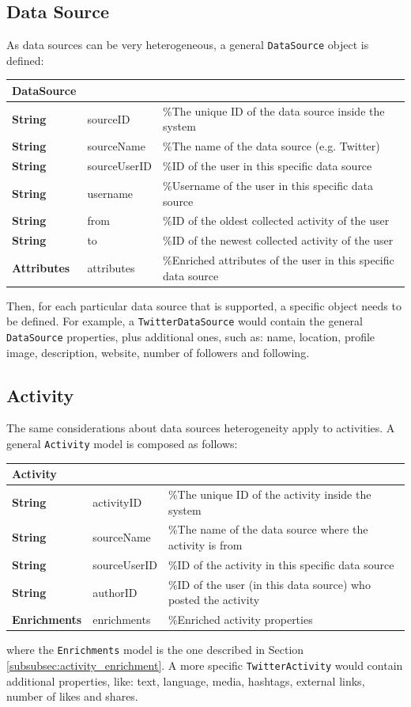 \subsection{Data Source}
As data sources can be very heterogeneous, a general \texttt{DataSource} object is defined:
\begin{center}
\begin{tabular}{lll}
\hline
DataSource & & \\
\hline
\textbf{String} & sourceID & \%The unique ID of the data source inside the system \\
\textbf{String} & sourceName & \%The name of the data source (e.g. Twitter) \\
\textbf{String} & sourceUserID & \%ID of the user in this specific data source \\
\textbf{String} & username & \%Username of the user in  this specific data source \\
\textbf{String} & from & \%ID of the oldest collected activity of the user \\
\textbf{String} & to & \%ID of the newest collected activity of the user \\
\textbf{Attributes} & attributes & \%Enriched attributes of the user in this specific data source \\
\hline
\end{tabular}
\end{center}
Then, for each particular data source that is supported, a specific object needs to be defined. For example, a \texttt{TwitterDataSource} would contain the general \texttt{DataSource} properties, plus additional ones, such as: name, location, profile image, description, website, number of followers and following.

\subsection{Activity}
The same considerations about data sources heterogeneity apply to activities. A general \texttt{Activity} model is composed as follows:
\begin{center}
\begin{tabular}{lll}
\hline
Activity & & \\
\hline
\textbf{String} & activityID & \%The unique ID of the activity inside the system \\
\textbf{String} & sourceName & \%The name of the data source where the activity is from \\
\textbf{String} & sourceUserID & \%ID of the activity in this specific data source \\
\textbf{String} & authorID & \%ID of the user (in this data source) who posted the activity \\
\textbf{Enrichments} & enrichments & \%Enriched activity properties\\
\hline
\end{tabular}
\end{center}
where the \texttt{Enrichments} model is  the one described in Section \ref{subsubsec:activity_enrichment}. A more specific \texttt{TwitterActivity} would contain additional properties, like: text, language, media, hashtags, external links, number of likes and shares.


